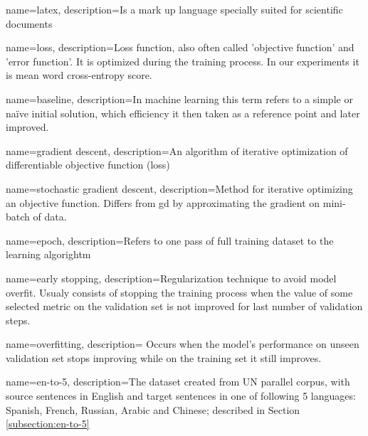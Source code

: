 

\makeglossaries

{
    name=latex,
    description={Is a mark up language specially suited 
    for scientific documents}
}

{
    name=loss,
    description={Loss function, also often called 'objective function' and
		 'error function'. It is optimized during the training
		 process. In our experiments it is mean word cross-entropy score.}
}

{
    name=baseline,
    description={In machine learning this term refers to a simple or
		 naïve initial solution, which efficiency it then
		 taken as a reference point and later improved.
		}
}

{
    name=gradient descent,
    description={An algorithm of iterative optimization of 
		 differentiable objective function (loss)}
}

{
    name=stochastic gradient descent,
    description={Method for iterative optimizing an objective function.
		 Differs from \gls{gd} by approximating the gradient
		 on mini-batch of data.}
}

{
    name=epoch,
    description={Refers to one pass of full training dataset to the learning 
		 algorightm
		}
}

{
    name=early stopping,
    description={Regularization technique to avoid model overfit.
		 Usualy consists of stopping the training process
		 when the value of some selected metric on the 
		 validation set is not improved for last number of
		 validation steps.
		}
}

{
    name=overfitting,
    description={
		 Occurs when the model's performance on unseen validation
		 set stops improving while on the training set
		 it still improves.
		}
}

{
    name=en-to-5,
    description={The dataset created from UN parallel corpus,
	with source sentences in English and target sentences
	in one of following 5 languages: Spanish, French, Russian,
	Arabic and Chinese; described in Section \ref{subsection:en-to-5}
	}
}

